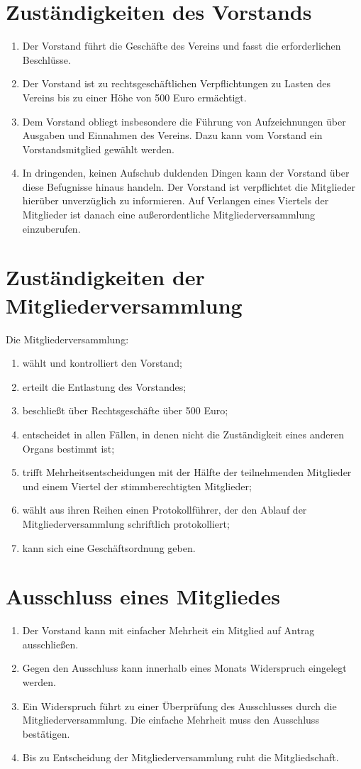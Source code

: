 \documentclass[ngerman]{article}
\begin{document}
\section{Zuständigkeiten des Vorstands}
\begin{enumerate}
  \item Der Vorstand führt die Geschäfte des Vereins und fasst die erforderlichen Beschlüsse.
  \item Der Vorstand ist zu rechtsgeschäftlichen Verpflichtungen zu Lasten des Vereins bis zu einer Höhe von 500 Euro ermächtigt.
  \item Dem Vorstand obliegt insbesondere die Führung von Aufzeichnungen über Ausgaben und Einnahmen des Vereins.   Dazu kann vom Vorstand ein Vorstandsmitglied gewählt werden.
  \item In dringenden, keinen Aufschub duldenden Dingen kann der Vorstand über diese Befugnisse hinaus handeln. Der Vorstand ist verpflichtet die Mitglieder hierüber unverzüglich zu informieren. Auf Verlangen eines Viertels der Mitglieder ist danach eine außerordentliche Mitgliederversammlung einzuberufen.
\end{enumerate}


\section{Zuständigkeiten der Mitgliederversammlung}
Die Mitgliederversammlung:
\begin{enumerate}
  \item wählt und kontrolliert den Vorstand;
  \item erteilt die Entlastung des Vorstandes;
  \item beschließt über Rechtsgeschäfte über 500 Euro;
  \item entscheidet in allen Fällen, in denen nicht die Zuständigkeit eines anderen Organs bestimmt ist;
  \item trifft Mehrheitsentscheidungen mit der Hälfte der teilnehmenden Mitglieder und einem Viertel der stimmberechtigten Mitglieder;
  \item wählt aus ihren Reihen einen Protokollführer, der den Ablauf der Mitgliederversammlung schriftlich protokolliert;
  \item kann sich eine Geschäftsordnung geben.
\end{enumerate}


\section{Ausschluss eines Mitgliedes}
\begin{enumerate}
  \item Der Vorstand kann mit einfacher Mehrheit ein Mitglied auf Antrag ausschließen.
  \item Gegen den Ausschluss kann innerhalb eines Monats Widerspruch eingelegt werden.
  \item Ein Widerspruch führt zu einer Überprüfung des Ausschlusses durch die Mitgliederversammlung. Die einfache Mehrheit muss den Ausschluss bestätigen.
  \item Bis zu Entscheidung der Mitgliederversammlung ruht die Mitgliedschaft.
\end{enumerate}
\end{document}
